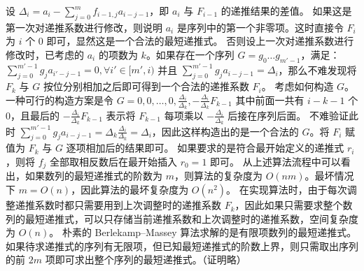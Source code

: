 \markdownRendererOlEndTight \markdownRendererInterblockSeparator
{}设 $\Delta_i = a_i - \sum_{j = 0} ^ m f_{i - 1, j} a_{i - j - 1}$，即 $a_i$ 与 $F_{i - 1}$ 的递推结果的差值。\markdownRendererParagraphSeparator
{}如果这是第一次对递推系数进行修改，则说明 $a_i$ 是序列中的第一个非零项。这时直接令 $F_i$ 为 $i$ 个 $0$ 即可，显然这是一个合法的最短递推式。\markdownRendererParagraphSeparator
{}否则设上一次对递推系数进行修改时，已考虑的 ${a_i}$ 的项数为 $k$。如果存在一个序列 $G = {g_0 \dots g_{m' - 1}}$，满足：\markdownRendererParagraphSeparator
{}$\sum_{j = 0} ^ {m' - 1} g_j a_{i' - j - 1} = 0, \forall i' \in [m', i)$\markdownRendererParagraphSeparator
{}并且 $\sum_{j = 0} ^ {m' - 1} g_j a_{i - j - 1} = \Delta_i$，那么不难发现将 $F_k$ 与 $G$ 按位分别相加之后即可得到一个合法的递推系数 $F_i$。\markdownRendererParagraphSeparator
{}考虑如何构造 $G$。一种可行的构造方案是令\markdownRendererParagraphSeparator
{}$G = {0, 0, \dots, 0, \frac{\Delta_i}{\Delta_k}, -\frac{\Delta_i}{\Delta_k}F_{k-1}}$\markdownRendererParagraphSeparator
{}其中前面一共有 $i - k - 1$ 个 $0$，且最后的 $-\frac{\Delta_i}{\Delta_k} F_{k-1}$ 表示将 $F_{k-1}$ 每项乘以 $-\frac{\Delta_i}{\Delta_k}$ 后接在序列后面。\markdownRendererParagraphSeparator
{}不难验证此时 $\sum_{j = 0} ^ {m' - 1} g_j a_{i - j - 1} = \Delta_k \frac{\Delta_i}{\Delta_k} = \Delta_i$，因此这样构造出的是一个合法的 $G$。将 $F_i$ 赋值为 $F_k$ 与 $G$ 逐项相加后的结果即可。\markdownRendererParagraphSeparator
{}如果要求的是符合最开始定义的递推式 ${r_i}$，则将 ${f_j}$ 全部取相反数后在最开始插入 $r_0 = 1$ 即可。\markdownRendererParagraphSeparator
{}从上述算法流程中可以看出，如果数列的最短递推式的阶数为 $m$，则算法的复杂度为 $O(nm)$。最坏情况下 $m = O(n)$，因此算法的最坏复杂度为 $O(n^2)$。\markdownRendererParagraphSeparator
{}在实现算法时，由于每次调整递推系数时都只需要用到上次调整时的递推系数 $F_k$，因此如果只需要求整个数列的最短递推式，可以只存储当前递推系数和上次调整时的递推系数，空间复杂度为 $O(n)$。\markdownRendererInterblockSeparator
{}
\markdownRendererSectionEnd \markdownRendererSectionBegin
{}\markdownRendererInterblockSeparator
{}\markdownRendererInterblockSeparator
{}朴素的 Berlekamp–Massey 算法求解的是有限项数列的最短递推式。如果待求递推式的序列有无限项，但已知最短递推式的阶数上界，则只需取出序列的前 $2m$ 项即可求出整个序列的最短递推式。（证明略）\markdownRendererInterblockSeparator
{}
\markdownRendererSectionEnd \markdownRendererSectionBegin
{}\markdownRendererInterblockSeparator
